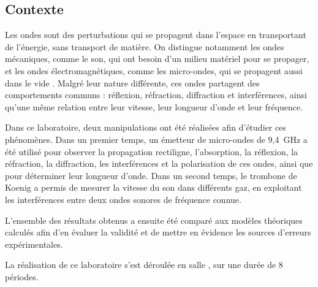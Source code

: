 \subsection{Contexte}

Les ondes sont des perturbations qui se propagent dans l'espace en transportant de l'énergie, sans transport de matière. On distingue notamment les ondes mécaniques, comme le son, qui ont besoin d'un milieu matériel pour se propager, et les ondes électromagnétiques, comme les micro-ondes, qui se propagent aussi dans le vide . Malgré leur nature différente, ces ondes partagent des comportements communs : réflexion, réfraction, diffraction et interférences, ainsi qu'une même relation entre leur vitesse, leur longueur d'onde et leur fréquence.

Dans ce laboratoire, deux manipulations ont été réalisées afin d'étudier ces phénomènes. Dans un premier temps, un émetteur de micro-ondes de 9,4~GHz a été utilisé pour observer la propagation rectiligne, l'absorption, la réflexion, la réfraction, la diffraction, les interférences et la polarisation de ces ondes, ainsi que pour déterminer leur longueur d'onde. Dans un second temps, le trombone de Koenig a permis de mesurer la vitesse du son dans différents gaz, en exploitant les interférences entre deux ondes sonores de fréquence connue.

L'ensemble des résultats obtenus a ensuite été comparé aux modèles théoriques calculés afin d'en évaluer la validité et de mettre en évidence les sources d'erreurs expérimentales.

La réalisation de ce laboratoire s'est déroulée en salle \salle, sur une durée de 8 périodes.
